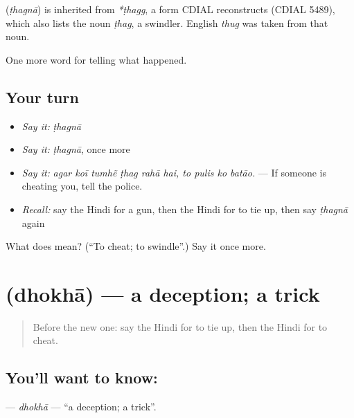 \begin{cousinweb}
\textbf{} (\emph{ṭhagnā}) is inherited from \emph{*ṭhagg}, a form CDIAL reconstructs (CDIAL 5489), which also lists the noun \emph{ṭhag}, a swindler. English \emph{thug} was taken from that noun.
\end{cousinweb}

\begin{grammarlens}[title={What you've built}]
One more word for telling what happened.
\end{grammarlens}

\subsection*{Your turn}
\begin{itemize}
\raggedright
  \item \emph{Say it:} \emph{ṭhagnā}
  \item \emph{Say it:} \emph{ṭhagnā}, once more
  \item \emph{Say it:} \emph{agar koī tumhẽ ṭhag rahā hai, to pulis ko batāo.} — If someone is cheating you, tell the police.
  \item \emph{Recall:} say the Hindi for a gun, then the Hindi for to tie up, then say \emph{ṭhagnā} again
\end{itemize}

\begin{tcolorbox}[breakable,colback=teal!4,colframe=teal!35!black,title={Before you move on}]
What does  mean? (\textquotedblleft{}To cheat; to swindle\textquotedblright{}.) Say it once more.
\end{tcolorbox}
\section[\texorpdfstring{\hi{धोखा} (dhokhā)}{धोखा (dhokhā)}]{ (dhokhā) — a deception; a trick}

\label{lesson:HI-C293-dhokha}



\begin{quote}
Before the new one: say the Hindi for to tie up, then the Hindi for to cheat.
\end{quote}

\subsection*{You'll want to know: }
\textbf{} — \emph{dhokhā} — \textquotedblleft{}a deception; a trick\textquotedblright{}.

